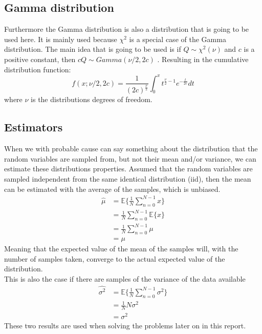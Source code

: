 \subsection{Gamma distribution}
Furthermore the Gamma distribution is also a distribution that is going to be used here. It is mainly used because $\chi^2$ is a special case of the Gamma distribution. The main idea that is going to be used is if $Q\sim\chi^2(\nu)$ and $c$ is a positive constant, then $cQ\sim Gamma(\nu/2, 2c)$ \cite{WikipediaGamma}. Resulting in the cumulative distribution function:
\begin{equation}
    f(x; \nu/2, 2c) = \frac{1}{(2c)^{\frac{\nu}{2}}}\int_{0}^{x}t^{\frac{\nu}{2}-1}e^{-\frac{t}{2c}}dt
\end{equation}
where $\nu$ is the distributions degrees of freedom.

\subsection{Estimators}
When we with probable cause can say something about the distribution that the random variables are sampled from, but not their mean and/or variance, we can estimate these distributions properties. Assumed that the random variables are sampled independent from the same identical distribution (iid), then the mean can be estimated with the average of the samples, which is unbiased.
\begin{align}
	\hat{\mu} & = \mathbb{E}\{\frac{1}{N}\sum_{n=0}^{N-1}x\}\nonumber\\
	& = \frac{1}{N}\sum_{n=0}^{N-1}\mathbb{E}\{x\}\nonumber\\
	& = \frac{1}{N}\sum_{n=0}^{N-1}\mu\nonumber\\
	& = \mu\label{eq:mu_est}
\end{align}
Meaning that the expected value of the mean of the samples will, with the number of samples taken, converge to the actual expected value of the distribution.\\
This is also the case if there are samples of the variance of the data available
\begin{align}
	\hat{\sigma^2} & = \mathbb{E}\{\frac{1}{N}\sum_{n=0}^{N-1}\sigma^2\}\nonumber\\
	& = \frac{1}{N}N\sigma^2\nonumber\\
	& = \sigma^2\label{eq:sigma_est}
\end{align}
These two results are used when solving the problems later on in this report.

